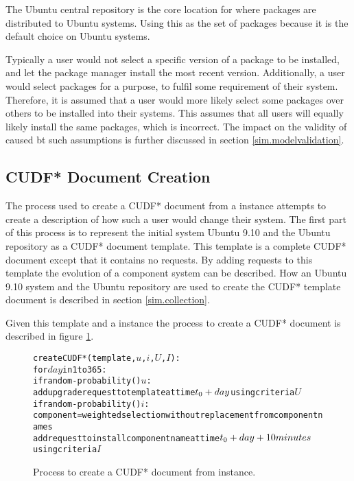 The Ubuntu central repository is the core location for where packages are distributed to Ubuntu systems.
Using this as the set of packages because it is the default choice on Ubuntu systems.

Typically a user would not select a specific version of a package to be installed, and let the package manager install the most recent version.
Additionally, a user would select packages for a purpose, to fulfil some requirement of their system.
Therefore, it is assumed that a user would more likely select some packages over others to be installed into their systems.
This assumes that all users will equally likely install the same packages, which is incorrect.
The impact on the validity of \usermodel caused bt such assumptions is further discussed in section \ref{sim.modelvalidation}.

\subsection{CUDF* Document Creation}
The process used to create a CUDF* document from a \usermodel instance attempts to create a description of how such a user would change their system.
The first part of this process is to represent the initial system Ubuntu 9.10 and the Ubuntu repository as a CUDF* document template.
This template is a complete CUDF* document except that it contains no requests.
By adding requests to this template the evolution of a component system can be described.
How an Ubuntu 9.10 system and the Ubuntu repository are used to create the CUDF* template document is described in section \ref{sim.collection}.

Given this template and a \usermodel instance the process to create a CUDF* document is described in figure \ref{sim.CUDF*}.
\begin{figure}[h]
\begin{center}
\begin{alltt}
createCUDF*(template, \( u\), \( i\), \( U\), \( I\)):
 for \(day\) in 1 to 365:
  if random-probability() \( u\):
    add upgrade request to template at time \(t\sb{0}+day\) using criteria \(U\)
  if random-probability() \( i\):  
   component = weighted selection without replacement from component names  
   add request to install component name at time \(t\sb{0}+day+10 minutes\) 
                                                      using criteria \(I\)
\end{alltt}
  \caption{Process to create a CUDF* document from \usermodel instance.}
  \label{sim.CUDF*}
\end{center}
\end{figure}

